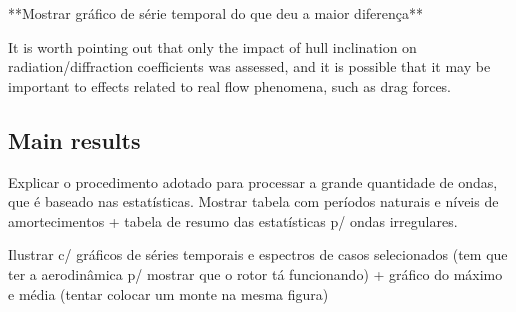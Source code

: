 **Mostrar gráfico de série temporal do que deu a maior diferença**

%

It is worth pointing out that only the impact of hull inclination on radiation/diffraction coefficients was assessed, and it is possible that it may be important to effects related to real flow phenomena, such as drag forces.





\subsection{Main results} \label{subsec:exp_vs_num:main_results}
Explicar o procedimento adotado para processar a grande quantidade de ondas, que é baseado nas estatísticas.
Mostrar tabela com períodos naturais e níveis de amortecimentos + tabela de resumo das estatísticas p/ ondas irregulares.

Ilustrar c/ gráficos de séries temporais e espectros de casos selecionados (tem que ter a aerodinâmica p/ mostrar que o rotor tá funcionando) + gráfico do máximo e média (tentar colocar um monte na mesma figura)


